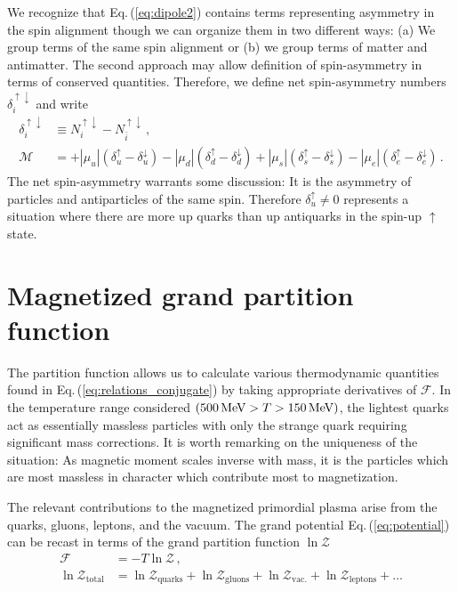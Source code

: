 \documentclass[epjST]{svjour}
\newcommand*{\MeV}{\text{\,MeV}}
\newcommand{\req}[1]{Eq.\,(\ref{#1})}
\numberwithin{equation}{section}
\begin{document}
We recognize that \req{eq:dipole2} contains terms representing asymmetry in the spin alignment though we can organize them in two different ways: (a) We group terms of the same spin alignment or (b) we group terms of matter and antimatter. The second approach may allow definition of spin-asymmetry in terms of conserved quantities. Therefore, we define net spin-asymmetry numbers $\delta_{i}^{\uparrow\downarrow}$ and write
\begin{align}
    \delta_{i}^{\uparrow\downarrow} &\equiv N_{i}^{\uparrow\downarrow}-N_{\bar{i}}^{\uparrow\downarrow}\,,\\
    \mathcal{M} &= 
    +|\mu_{u}|(\delta_{u}^{\uparrow}-\delta_{u}^{\downarrow})
    -|\mu_{d}|(\delta_{d}^{\uparrow}-\delta_{d}^{\downarrow})
    +|\mu_{s}|(\delta_{s}^{\uparrow}-\delta_{s}^{\downarrow})
    -|\mu_{e}|(\delta_{e}^{\uparrow}-\delta_{e}^{\downarrow})\,.
\end{align}
The net spin-asymmetry warrants some discussion: It is the asymmetry of particles and antiparticles of the same spin. Therefore $\delta_{u}^{\uparrow}\neq0$ represents a situation where there are more up quarks than up antiquarks in the spin-up $\uparrow$ state.

\section{Magnetized grand partition function}
\label{sec:partition}
The partition function allows us to calculate various thermodynamic quantities found in \req{eq:relations_conjugate} by taking appropriate derivatives of $\mathcal{F}$. In the temperature range considered $(500\MeV>T>150\MeV)$, the lightest quarks act as essentially massless particles with only the strange quark requiring significant mass corrections. It is worth remarking on the uniqueness of the situation: As magnetic moment scales inverse with mass, it is the particles which are most massless in character which contribute most to magnetization.

The relevant contributions to the magnetized primordial plasma arise from the quarks, gluons, leptons, and the vacuum. The grand potential \req{eq:potential} can be recast in terms of the grand partition function $\ln\mathcal{Z}$
\begin{align}
    \label{eq:parts}
    \mathcal{F} &= -T\ln\mathcal{Z}\,,\\
    \ln\mathcal{Z}_{\mathrm{total}} &=
    \ln\mathcal{Z}_{\mathrm{quarks}} +
    \ln\mathcal{Z}_{\mathrm{gluons}} +
    \ln\mathcal{Z}_{\mathrm{vac.}} + 
    \ln\mathcal{Z}_{\mathrm{leptons}}+\ldots 
\end{align}
\end{document}
